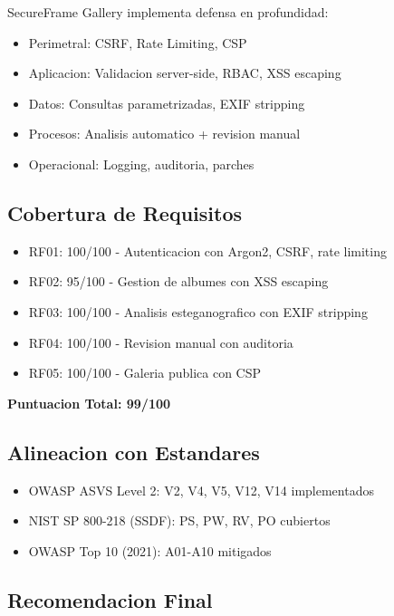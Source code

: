 \documentclass[12pt,a4paper]{article}
\begin{document}
SecureFrame Gallery implementa defensa en profundidad:

\begin{itemize}
    \item[*] Perimetral: CSRF, Rate Limiting, CSP
    \item[*] Aplicacion: Validacion server-side, RBAC, XSS escaping
    \item[*] Datos: Consultas parametrizadas, EXIF stripping
    \item[*] Procesos: Analisis automatico + revision manual
    \item[*] Operacional: Logging, auditoria, parches
\end{itemize}

\subsection{Cobertura de Requisitos}

\begin{itemize}
    \item RF01: 100/100 - Autenticacion con Argon2, CSRF, rate limiting
    \item RF02: 95/100 - Gestion de albumes con XSS escaping
    \item RF03: 100/100 - Analisis esteganografico con EXIF stripping
    \item RF04: 100/100 - Revision manual con auditoria
    \item RF05: 100/100 - Galeria publica con CSP
\end{itemize}

\textbf{Puntuacion Total: 99/100}

\subsection{Alineacion con Estandares}

\begin{itemize}
    \item[*] OWASP ASVS Level 2: V2, V4, V5, V12, V14 implementados
    \item[*] NIST SP 800-218 (SSDF): PS, PW, RV, PO cubiertos
    \item[*] OWASP Top 10 (2021): A01-A10 mitigados
\end{itemize}

\subsection{Recomendacion Final}
\end{document}
